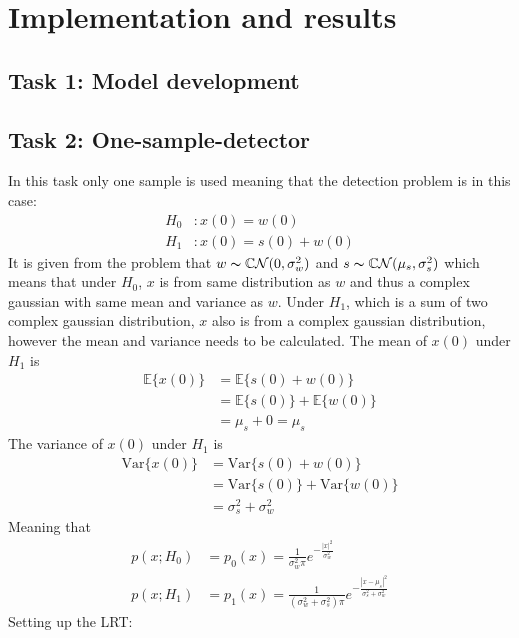 \section{Implementation and results}\label{sec:results}
\subsection{Task 1: Model development}
\subsection{Task 2: One-sample-detector}
In this task only one sample is used meaning that the detection problem is in this case:
\begin{align}
    H_0 &: x(0) = w(0)\nonumber\\
    H_1 &: x(0) = s(0)+w(0)\nonumber
\end{align}
It is given from the problem that $w\thicksim\mathbb{C}\mathcal{N}(0, \sigma_w^2)$ and $s\thicksim\mathbb{C}\mathcal{N}(\mu_s, \sigma_s^2)$ which means that under $H_0$, $x$ is from same distribution as $w$ and thus a complex gaussian with same mean and variance as $w$. Under $H_1$, which is a sum of two complex gaussian distribution, $x$ also is from a complex gaussian distribution, however the mean and variance needs to be calculated.
The mean of $x(0)$ under $H_1$ is
\begin{align}
    \mathbb{E}\{x(0)\} & = \mathbb{E}\{s(0)+w(0)\}\nonumber\\
    & = \mathbb{E}\{s(0)\} + \mathbb{E}\{w(0)\}\nonumber\\
    & = \mu_s + 0 = \mu_s\nonumber
\end{align} 
The variance of $x(0)$ under $H_1$ is
\begin{align}
    \mathrm{Var}\{x(0)\} & = \mathrm{Var}\{s(0)+w(0)\}\nonumber\\
    & = \mathrm{Var}\{s(0)\} + \mathrm{Var}\{w(0)\}\nonumber\\
    & = \sigma_s^2+\sigma_w^2\nonumber
\end{align}
Meaning that
\begin{align}
    p(x;H_0) & = p_0(x) = \frac{1}{\sigma_w^2\pi}e^{-\frac{|x|^2}{\sigma_w^2}}\\
    p(x;H_1) & = p_1(x) = \frac{1}{(\sigma_w^2+\sigma_s^2)\pi}e^{-\frac{|x-\mu_s|^2}{\sigma_s^2+\sigma_w^2}}
\end{align}
Setting up the LRT:
